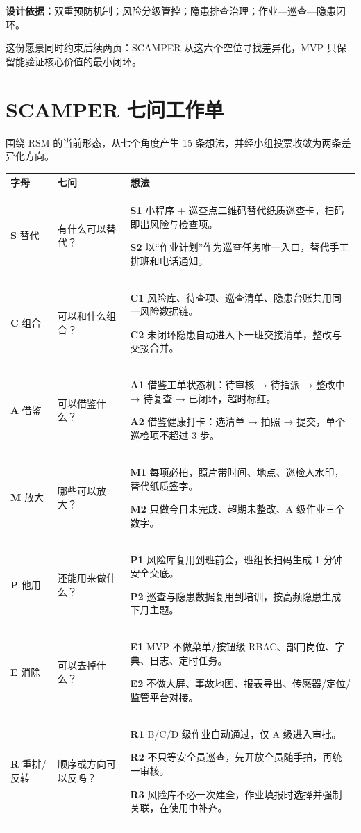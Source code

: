 \documentclass[11pt,a4paper,twoside,fontset=fandol]{ctexart}
\begin{document}
\vspace{4pt}
\noindent\textbf{设计依据：}双重预防机制；风险分级管控；隐患排查治理；作业—巡查—隐患闭环。

\vspace{2pt}
\noindent 这份愿景同时约束后续两页：SCAMPER 从这六个空位寻找差异化，MVP 只保留能验证核心价值的最小闭环。

\newpage

\section{SCAMPER 七问工作单}

围绕 RSM 的当前形态，从七个角度产生 15 条想法，并经小组投票收敛为两条差异化方向。

\begin{table}[H]
\centering
\scriptsize
\renewcommand{\arraystretch}{1.05}
\begin{tabularx}{\linewidth}{@{}>{\raggedright\arraybackslash}p{14mm}>{\raggedright\arraybackslash}p{22mm}X@{}}
\toprule
\textbf{字母} & \textbf{七问} & \textbf{想法} \\
\midrule
\textsf{\textbf{S}} 替代 & 有什么可以替代？ & \textbf{S1} 小程序 + 巡查点二维码替代纸质巡查卡，扫码即出风险与检查项。\par
\textbf{S2} 以“作业计划”作为巡查任务唯一入口，替代手工排班和电话通知。 \\
\textsf{\textbf{C}} 组合 & 可以和什么组合？ & \textbf{C1} 风险库、待查项、巡查清单、隐患台账共用同一风险数据链。\par
\textbf{C2} 未闭环隐患自动进入下一班交接清单，整改与交接合并。 \\
\textsf{\textbf{A}} 借鉴 & 可以借鉴什么？ & \textbf{A1} 借鉴工单状态机：待审核 → 待指派 → 整改中 → 待复查 → 已闭环，超时标红。\par
\textbf{A2} 借鉴健康打卡：选清单 → 拍照 → 提交，单个巡检项不超过 3 步。 \\
\textsf{\textbf{M}} 放大 & 哪些可以放大？ & \textbf{M1} 每项必拍，照片带时间、地点、巡检人水印，替代纸质签字。\par
\textbf{M2} 只做今日未完成、超期未整改、A 级作业三个数字。 \\
\textsf{\textbf{P}} 他用 & 还能用来做什么？ & \textbf{P1} 风险库复用到班前会，班组长扫码生成 1 分钟安全交底。\par
\textbf{P2} 巡查与隐患数据复用到培训，按高频隐患生成下月主题。 \\
\textsf{\textbf{E}} 消除 & 可以去掉什么？ & \textbf{E1} MVP 不做菜单/按钮级 RBAC、部门岗位、字典、日志、定时任务。\par
\textbf{E2} 不做大屏、事故地图、报表导出、传感器/定位/监管平台对接。 \\
\textsf{\textbf{R}} 重排/反转 & 顺序或方向可以反吗？ & \textbf{R1} B/C/D 级作业自动通过，仅 A 级进入审批。\par
\textbf{R2} 不只等安全员巡查，先开放全员随手拍，再统一审核。\par
\textbf{R3} 风险库不必一次建全，作业填报时选择并强制关联，在使用中补齐。 \\
\bottomrule
\end{tabularx}
\end{table}
\end{document}
